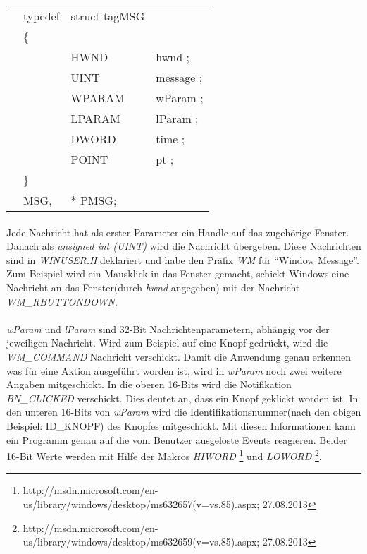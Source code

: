 \begin{tabular}{llll}
& typedef & struct tagMSG\\
& \{\\
&  & HWND   & hwnd ;\\
&  & UINT   & message ;\\
&  & WPARAM & wParam ;\\
&  & LPARAM & lParam ;\\
&  & DWORD  & time ;\\
&  & POINT  & pt ;\\
& \}\\
& MSG,&* PMSG;\\
\end{tabular}

\paragraph{}
Jede Nachricht hat als erster Parameter ein Handle auf das zugehörige Fenster. Danach als \textit{unsigned int (UINT)} wird die Nachricht übergeben. Diese Nachrichten sind in \textit{WINUSER.H} deklariert und habe den Präfix \textit{WM} für "`Window Message"'. Zum Beispiel wird ein Mausklick in das Fenster gemacht, schickt Windows eine Nachricht an das Fenster(durch \textit{hwnd} angegeben) mit der Nachricht \textit{WM\_RBUTTONDOWN}.

\paragraph{}
\textit{wParam} und \textit{lParam} sind 32-Bit Nachrichtenparametern, abhängig vor der jeweiligen Nachricht. Wird zum Beispiel auf eine Knopf gedrückt, wird die \textit{WM\_COMMAND} Nachricht verschickt. Damit die Anwendung genau erkennen was für eine Aktion ausgeführt worden ist, wird in \textit{wParam} noch zwei weitere Angaben mitgeschickt. In die oberen 16-Bits wird die Notifikation \textit{BN\_CLICKED} verschickt. Dies deutet an, dass ein Knopf geklickt worden ist. In den unteren 16-Bits von \textit{wParam} wird die Identifikationsnummer(nach den obigen Beispiel: ID\_KNOPF) des Knopfes mitgeschickt. Mit diesen Informationen kann ein Programm genau auf die vom Benutzer ausgelöste Events reagieren. Beider 16-Bit Werte werden mit Hilfe der Makros \textit{HIWORD} \footnote{http://msdn.microsoft.com/en-us/library/windows/desktop/ms632657(v=vs.85).aspx; 27.08.2013} und \textit{LOWORD} \footnote{http://msdn.microsoft.com/en-us/library/windows/desktop/ms632659(v=vs.85).aspx; 27.08.2013}.

